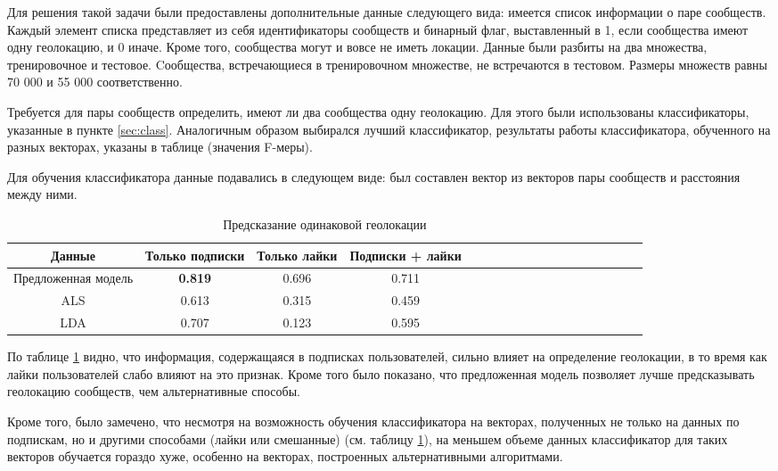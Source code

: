 \documentclass[times,specification,annotation]{itmo-student-thesis}
\begin{document}
Для решения такой задачи были предоставлены дополнительные данные следующего вида: имеется список информации о паре сообществ. Каждый элемент списка представляет из себя идентификаторы сообществ и бинарный флаг, выставленный в 1, если сообщества имеют одну геолокацию, и 0 иначе. Кроме того, сообщества могут и вовсе не иметь локации. Данные были разбиты на два множества, тренировочное и тестовое. Cообщества, встречающиеся в тренировочном множестве, не встречаются в тестовом. Размеры множеств равны 70 000 и 55 000 соответственно.

Требуется для пары сообществ определить, имеют ли два сообщества одну геолокацию. Для этого были использованы классификаторы, указанные в пункте \ref{sec:class}. Аналогичным образом выбирался лучший классификатор, результаты работы классификатора, обученного на разных векторах, указаны в таблице (значения F-меры). 

Для обучения классификатора данные подавались в следующем виде: был составлен вектор из векторов пары сообществ и расстояния между ними. 

\begin{table}[!h]
\caption{Предсказание одинаковой геолокации} \label{tab2-geo-cmp}
\centering
\begin{tabular}{|*{18}{c|}}\hline
Данные  & Только подписки  & Только лайки & Подписки + лайки \\\hline
Предложенная модель                        & \textbf{0.819} & 0.696  & 0.711 \\\hline
ALS                       & 0.613 & 0.315  & 0.459 \\\hline
LDA                       & 0.707 & 0.123  & 0.595 \\\hline
\end{tabular}
\end{table}

По таблице \ref {tab2-geo-cmp} видно, что информация, содержащаяся в подписках пользователей, сильно влияет на определение геолокации, в то время как лайки пользователей слабо влияют на это признак. Кроме того было показано, что предложенная модель позволяет лучше предсказывать геолокацию сообществ, чем альтернативные способы. 

Кроме того, было замечено, что несмотря на возможность обучения классификатора на векторах, полученных не только на данных по подпискам, но и другими способами (лайки или смешанные) (см. таблицу \ref{tab2-geo-cmp}), на меньшем объеме данных классификатор для таких векторов обучается гораздо хуже, особенно на векторах, построенных альтернативными алгоритмами. 
\end{document}

